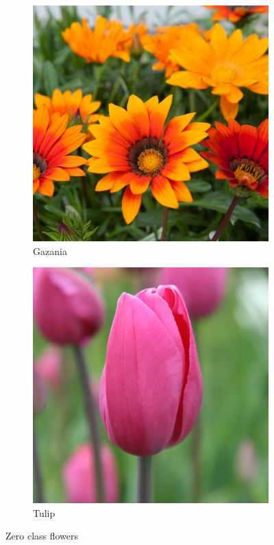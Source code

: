 \documentclass[11]{article}
\begin{document}
\begin{figure}[H]
    \begin{subfigure}[t]{0.45\textwidth}
    \centering
  \includegraphics[scale=0.20]{images/gazania.jpg}
    \caption{Gazania}
    \label{gazania}
    \end{subfigure}
    \begin{subfigure}[t]{0.45\textwidth}
    \centering
    \includegraphics[scale=0.20]{images/tulip.jpg}
    \caption{Tulip}
    \label{tulip}
    \end{subfigure}
    \label{zero}
    \caption{Zero class flowers}
\end{figure}
\end{document}
